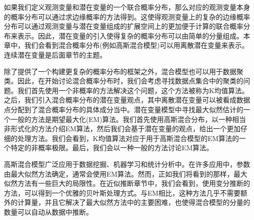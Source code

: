 如果我们定义观测变量和潜在变量的一个联合概率分布，那么对应的观测变量本身的概率分布可以通过求边缘概率的方法得到。这使得观测变量上的复杂的边缘概率分布可以通过观测变量与潜在变量组成的扩展空间上的更加便于计算的联合概率分布来表示。因此，潜在变量的引入使得复杂的概率分布可以由简单的分量组成。本章中，我们会看到混合概率分布(例如高斯混合模型)可以用离散潜在变量来表示。连续潜在变量是后面章节的主题。

除了提供了一个构建更复杂的概率分布的框架之外，混合模型也可以用于数据聚类。因此，在开始讨论混合概率分布时，我们会考虑寻找数据点集合中的聚类的问题。我们首先使用一个非概率的方法解决这个问题，这个方法被称为K均值算法。之后，我们引入混合概率分布的潜在变量观点，其中离散潜在变量可以被看成数据点分配到了混合概率分布的具体成分当中。潜在变量模型中寻找最大似然估计的一个一般的方法是期望最大化(EM)算法。我们首先使用高斯混合分布，以一种相当非形式化的方法介绍EM算法，然后我们会基于潜在变量的观点，给出一个更加仔细的处理方法。我们会看到，K均值算法对应于用于高斯混合模型的EM算法的一个特定的非概率极限。最后，我们会以一种一般的方法讨论EM算法。

高斯混合模型广泛应用于数据挖掘、机器学习和统计分析中。在许多应用中，参数由最大似然方法确定，通常会使用EM算法。然而，正如我们将看到的那样，最大似然方法有一些巨大的局限性。在近似推断章节中，我们会看到，使用变分推断的方法，可以得到一个优雅的贝叶斯处理方式。与EM相比，这种方法几乎不需要额外的计算量，并且它解决了最大似然方法中的主要困难，也使得混合模型的分量的数量可以自动从数据中推断。